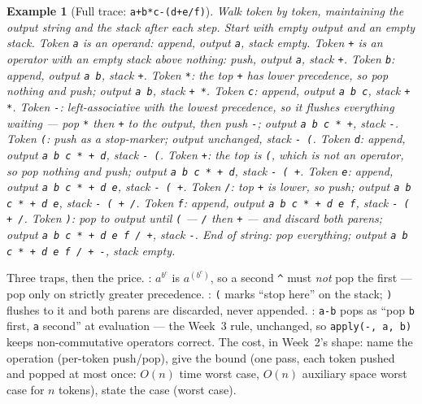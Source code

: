 \documentclass[11pt]{article}
\newtheorem{example}{Example}[section]
\begin{document}
\begin{example}[Full trace: \texttt{a+b*c-(d+e/f)}]
Walk token by token, maintaining the output string and the stack after each step. Start with empty output and an empty stack. Token \texttt{a} is an operand: append, output \texttt{a}, stack empty. Token \texttt{+} is an operator with an empty stack above nothing: push, output \texttt{a}, stack \texttt{+}. Token \texttt{b}: append, output \texttt{a b}, stack \texttt{+}. Token \texttt{*}: the top \texttt{+} has lower precedence, so pop nothing and push; output \texttt{a b}, stack \texttt{+ *}. Token \texttt{c}: append, output \texttt{a b c}, stack \texttt{+ *}. Token \texttt{-}: left-associative with the lowest precedence, so it flushes everything waiting --- pop \texttt{*} then \texttt{+} to the output, then push \texttt{-}; output \texttt{a b c * +}, stack \texttt{-}. Token \texttt{(}: push as a stop-marker; output unchanged, stack \texttt{- (}. Token \texttt{d}: append, output \texttt{a b c * + d}, stack \texttt{- (}. Token \texttt{+}: the top is \texttt{(}, which is not an operator, so pop nothing and push; output \texttt{a b c * + d}, stack \texttt{- ( +}. Token \texttt{e}: append, output \texttt{a b c * + d e}, stack \texttt{- ( +}. Token \texttt{/}: top \texttt{+} is lower, so push; output \texttt{a b c * + d e}, stack \texttt{- ( + /}. Token \texttt{f}: append, output \texttt{a b c * + d e f}, stack \texttt{- ( + /}. Token \texttt{)}: pop to output until \texttt{(} --- \texttt{/} then \texttt{+} --- and discard both parens; output \texttt{a b c * + d e f / +}, stack \texttt{-}. End of string: pop everything; output \texttt{a b c * + d e f / + -}, stack empty. 
\end{example}

Three traps, then the price. : $a^{b^{c}}$ is $a^{(b^{c})}$, so a second \texttt{\^{}} must \emph{not} pop the first --- pop only on strictly greater precedence. : \texttt{(} marks ``stop here'' on the stack; \texttt{)} flushes to it and both parens are discarded, never appended. : \texttt{a-b} pops as ``pop \texttt{b} first, \texttt{a} second'' at evaluation --- the Week~3 rule, unchanged, so \texttt{apply(-, a, b)} keeps non-commutative operators correct. The cost, in Week~2's shape: name the operation (per-token push/pop), give the bound (one pass, each token pushed and popped at most once: $O(n)$ time worst case, $O(n)$ auxiliary space worst case for $n$ tokens), state the case (worst case).
\end{document}
